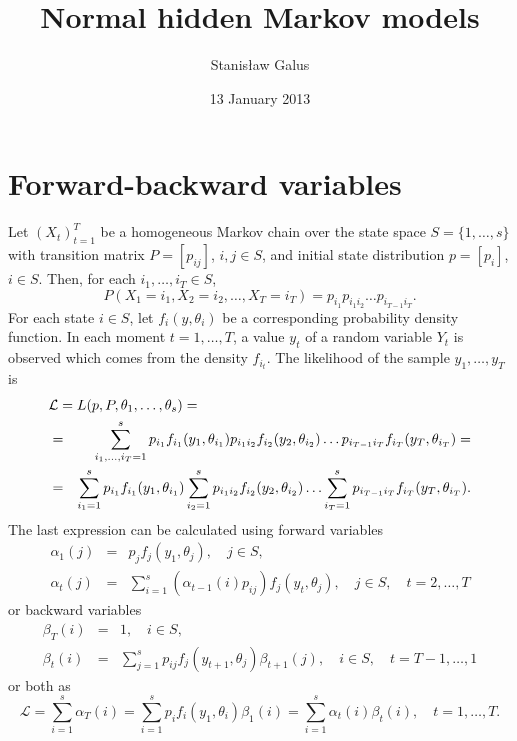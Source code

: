 \documentclass[a4paper,11pt]{article}
\title{Normal hidden Markov models}
\author{Stanis{\l}aw Galus}
\date{13 January 2013}
\renewcommand{\Pr}{\mathit{P}}
\begin{document}
\maketitle

\section{Forward-backward variables}

Let $(X_t)_{t = 1}^T$ be a homogeneous Markov chain over the state
space $S = \{1, \ldots, s\}$ with transition matrix $P = [p_{ij}]$,
$i, j \in S$, and initial state distribution $p = [p_i]$, $i \in S$.
Then, for each $i_1, \ldots, i_T \in S$,
\[
\Pr(X_1 = i_1, X_2 = i_2, \ldots, X_T = i_T) = p_{i_1}p_{i_1i_2}
\ldots p_{i_{T - 1}i_T}.
\]
For each state $i \in S$, let $f_i(y, \theta_i)$ be a corresponding
probability density function. In each moment $t = 1, \ldots, T$, a
value $y_t$ of a random variable $Y_t$ is observed which comes from
the density $f_{i_t}$. The likelihood of the sample $y_1, \ldots, y_T$
is
\begin{eqnarray*}
  \lefteqn{\mathcal{L} = L(p, P, \theta_1, \ldots, \theta_s) =} \\ & =
  & \sum_{i_1, \ldots, i_T = 1}^s p_{i_1}f_{i_1}(y_1, \theta_{i_1})
  p_{i_1i_2}f_{i_2}(y_2, \theta_{i_2}) \ldots p_{i_{T - 1}i_T}
  f_{i_T}(y_T, \theta_{i_T}) = \\ & = & \sum_{i_1 = 1}^s
  p_{i_1}f_{i_1}(y_1, \theta_{i_1}) \sum_{i_2 = 1}^s
  p_{i_1i_2}f_{i_2}(y_2, \theta_{i_2}) \ldots \sum_{i_T = 1}^s p_{i_{T
      - 1}i_T}f_{i_T}(y_T, \theta_{i_T}).
\end{eqnarray*}
The last expression can be calculated using forward variables
\begin{eqnarray}
  \label{eq:alpha1}
  \alpha_1(j) & = & p_j f_j(y_1, \theta_j), \hspace{1em} j \in S, \\
  \label{eq:alphat}
  \alpha_t(j) & = & \sum_{i = 1}^s (\alpha_{t - 1}(i)p_{ij})
  f_j(y_t, \theta_j),
  \hspace{1em} j\in S, \hspace{1em} t = 2, \ldots, T
\end{eqnarray}
or backward variables
\begin{eqnarray}
  \label{eq:betaT}
  \beta_T(i) & = & 1, \hspace{1em} i \in S, \\
  \label{eq:betat}
  \beta_t(i) & = & \sum_{j = 1}^s p_{ij}f_j(y_{t + 1},
  \theta_j)\beta_{t + 1}(j),
  \hspace{1em} i \in S, \hspace{1em} t = T - 1, \ldots, 1
\end{eqnarray}
or both as
\begin{equation}
  \label{eq:likelihood}
  \mathcal{L} = \sum_{i = 1}^s \alpha_T(i) = \sum_{i = 1}^s p_i f_i(y_1,
  \theta_i) \beta_1(i) = \sum_{i = 1}^s
  \alpha_t(i)\beta_t(i), \hspace{1em} t = 1, \ldots, T.
\end{equation}
\end{document}
